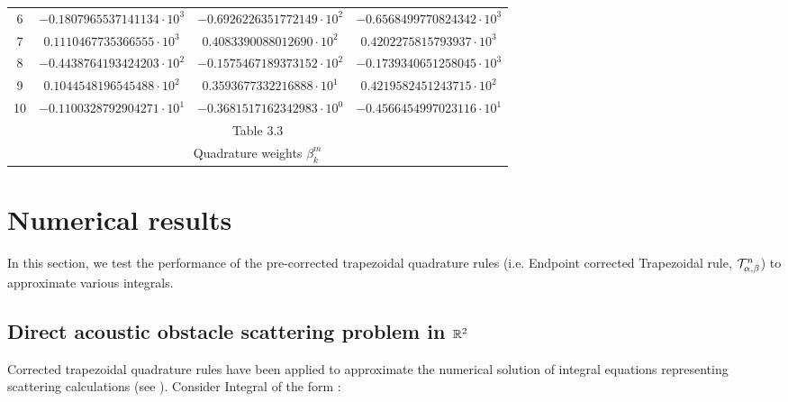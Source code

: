 \documentclass[../document.tex]{subfiles}
\begin{document}
\begin{center}
{\begin{tabular}{ | c || c || c || c | }
				6  &$-0.1807965537141134\cdot 10^{3}$  &$-0.6926226351772149\cdot 10^{2}$ &$-0.6568499770824342\cdot 10^{3}$\\
				7  & $0.1110467735366555\cdot 10^{3}$  &$0.4083390088012690\cdot 10^{2}$  &$0.4202275815793937\cdot 10^{3}$\\
				8  &$-0.4438764193424203\cdot 10^{2}$  &$-0.1575467189373152\cdot 10^{2}$ &$-0.1739340651258045\cdot 10^{3}$\\
				9  & $0.1044548196545488\cdot 10^{2}$  &$0.3593677332216888\cdot 10^{1}$  &$0.4219582451243715\cdot 10^{2}$\\
				10 &$-0.1100328792904271\cdot 10^{1}$  &$-0.3681517162342983\cdot 10^{0}$ &$-0.4566454997023116\cdot 10^{1}$\\
				\hline
				
				\multicolumn{4}{|c|}{		Table 3.3                     }\\
				\multicolumn{4}{|c|}{	Quadrature weights $\beta_{k}^m$  }\\
				
				\hline
		\end{tabular}}
	\end{center} 
	
	
	\section{Numerical results}
	
	In this section, we test the performance of the pre-corrected trapezoidal quadrature rules (i.e. Endpoint corrected Trapezoidal rule, $\mathcal{T}_{\alpha,\beta}^{n}$) to
	approximate various integrals. 
	
	\subsection{Direct acoustic obstacle scattering problem in $\mathbb{R}^2$}
	
	Corrected trapezoidal quadrature rules have been applied to approximate the
	numerical solution of integral equations representing scattering calculations 
	(see \cite{aguilar2005high,aguilar2004high}).
	Consider Integral of the form :
	
\end{document}
